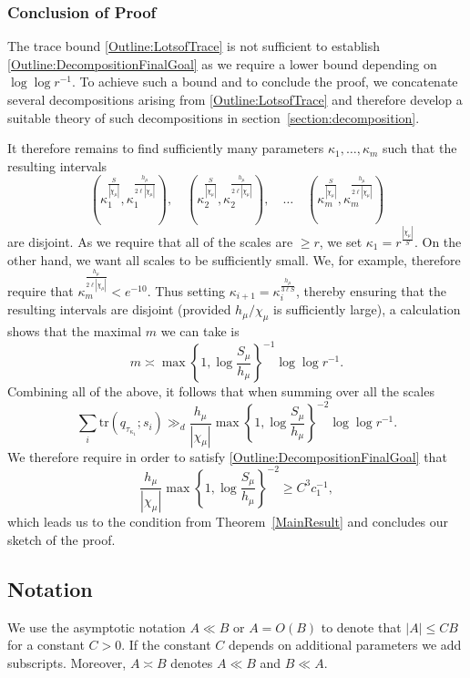 \documentclass[10pt, english,oneside,reqno]{amsart}
\theoremstyle{plain}
\theoremstyle{remark}
\numberwithin{equation}{section}
\numberwithin{figure}{section}
\begin{document}
\subsubsection*{\normalfont\textbf{Conclusion of Proof}} The trace bound \eqref{Outline:LotsofTrace} is not sufficient to establish \eqref{Outline:DecompositionFinalGoal} as we require a lower bound depending on $\log \log r^{-1}$. To achieve such a bound and to conclude the proof, we concatenate several decompositions arising from \eqref{Outline:LotsofTrace} and therefore develop a suitable theory of such decompositions in section~\ref{section:decomposition}.

It therefore remains to find sufficiently many parameters $\kappa_1, \ldots, \kappa_m$ such that the resulting intervals $$(\kappa_1^{\frac{S}{|\chi_{\mu}|}},\kappa_1^{\frac{h_{\mu}}{2\ell|\chi_{\mu}|}}), \quad (\kappa_2^{\frac{S}{|\chi_{\mu}|}},\kappa_2^{\frac{h_{\mu}}{2\ell|\chi_{\mu}|}}), \quad \ldots \quad (\kappa_m^{\frac{S}{|\chi_{\mu}|}},\kappa_m^{\frac{h_{\mu}}{2\ell|\chi_{\mu}|}})$$ are disjoint. As we require that all of the scales are $\geq r$, we set $\kappa_1 = r^{\frac{|\chi_{\mu}|}{S}}$. On the other hand, we want all scales to be sufficiently small. We, for example, therefore require that $\kappa_m^{\frac{h_{\mu}}{2\ell|\chi_{\mu}|}} < e^{-10}$. Thus setting $\kappa_{i + 1} = \kappa_i^{\frac{h_{\mu}}{3\ell S}}$, thereby ensuring that the resulting intervals are disjoint (provided $h_{\mu}/\chi_{\mu}$ is sufficiently large), a calculation shows that the maximal $m$ we can take is $$ m \asymp \max\left\{ 1,\log \frac{S_{\mu}}{h_{\mu}}  \right\}^{-1}\log \log r^{-1} .$$ Combining all of the above, it follows that when summing over all the scales $$\sum_{i} \mathrm{tr}(q_{\tau_{\kappa_1}}; s_i) \gg_d \frac{h_{\mu}}{|\chi_{\mu}|}  \max\left\{ 1,\log \frac{S_{\mu}}{h_{\mu}}  \right\}^{-2} \log \log r^{-1}.$$ We therefore require in order to satisfy \eqref{Outline:DecompositionFinalGoal} that $$\frac{h_{\mu}}{|\chi_{\mu}|}  \max\left\{ 1,\log \frac{S_{\mu}}{h_{\mu}}  \right\}^{-2}  \geq C^3c_1^{-1},$$ which leads us to the condition from Theorem~\ref{MainResult} and concludes our sketch of the proof.



\subsection{Notation} \label{section:Notation} We use the asymptotic notation $A \ll B$ or $A = O(B)$ to denote that $|A| \leq CB$ for a constant $C > 0$. If the constant $C$ depends on additional parameters we add subscripts. Moreover, $A \asymp B$ denotes $A \ll B$ and $B \ll A$. 
\end{document}
